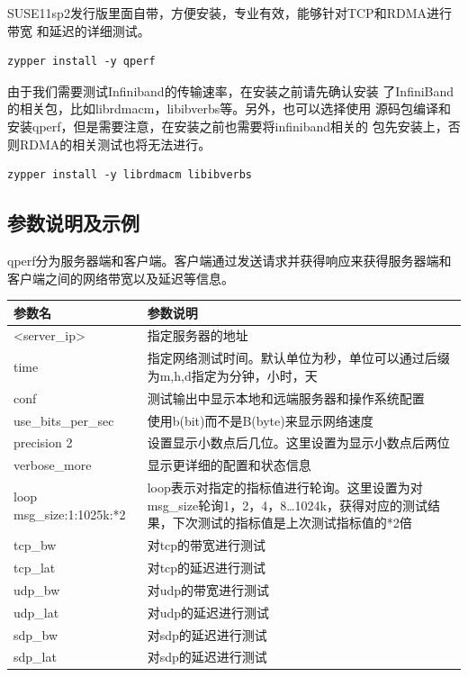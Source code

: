 SUSE11sp2发行版里面自带，方便安装，专业有效，能够针对TCP和RDMA进行带宽
和延迟的详细测试。

\begin{verbatim}
zypper install -y qperf
\end{verbatim}

由于我们需要测试Infiniband的传输速率，在安装之前请先确认安装
了InfiniBand的相关包，比如librdmacm，libibverbs等。另外，也可以选择使用
源码包编译和安装qperf，但是需要注意，在安装之前也需要将infiniband相关的
包先安装上，否则RDMA的相关测试也将无法进行。

\begin{verbatim}
zypper install -y librdmacm libibverbs
\end{verbatim}

\subsection{参数说明及示例}

qperf分为服务器端和客户端。客户端通过发送请求并获得响应来获得服务器端和
客户端之间的网络带宽以及延迟等信息。

\begin{tabular}{lp{20em}}
  \toprule
  参数名       & 参数说明 \\
  \midrule
  <server\_ip>	& 指定服务器的地址 \\
  time            & 指定网络测试时间。默认单位为秒，单位可以通过后缀为m,h,d指定为分钟，小时，天 \\
  conf	        & 测试输出中显示本地和远端服务器和操作系统配置 \\
  use\_bits\_per\_sec & 使用b(bit)而不是B(byte)来显示网络速度 \\
  precision 2	& 设置显示小数点后几位。这里设置为显示小数点后两位 \\
  verbose\_more	& 显示更详细的配置和状态信息 \\
  loop msg\_size:1:1025k:*2 	& loop表示对指定的指标值进行轮询。这里设置为对msg\_size轮询1，2，4，8…1024k，获得对应的测试结果，下次测试的指标值是上次测试指标值的*2倍 \\
  tcp\_bw	& 对tcp的带宽进行测试 \\
  tcp\_lat	& 对tcp的延迟进行测试 \\
  udp\_bw	& 对udp的带宽进行测试 \\
  udp\_lat	& 对udp的延迟进行测试 \\
  sdp\_bw	& 对sdp的延迟进行测试 \\
  sdp\_lat	& 对sdp的延迟进行测试 \\
\bottomrule
\end{tabular}

